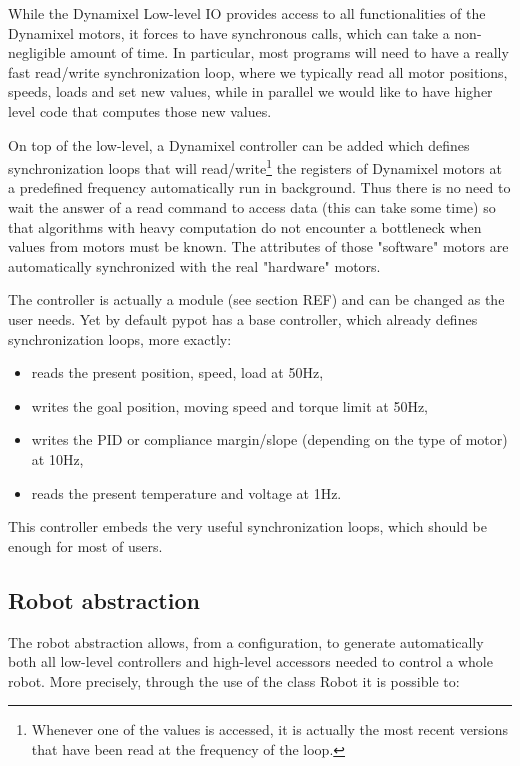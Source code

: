 While the Dynamixel Low-level IO provides access to all functionalities of the Dynamixel motors, it forces to have synchronous calls, which can take a non-negligible amount of time. In particular, most programs will need to have a really fast read/write synchronization loop, where we typically read all motor positions, speeds, loads and set new values, while in parallel we would like to have higher level code that computes those new values.

On top of the low-level, a Dynamixel controller can be added which defines synchronization loops that will read/write\footnote{Whenever one of the values is accessed, it is actually the most recent versions that have been read at the frequency of the loop.} the registers of Dynamixel motors at a predefined frequency automatically run in background. Thus there is no need to wait the answer of a read command to access data (this can take some time) so that algorithms with heavy computation do not encounter a bottleneck when values from motors must be known. The attributes of those "software" motors are automatically synchronized with the real "hardware" motors.

The controller is actually a module (see section REF) and can be changed as the user needs. Yet by default pypot has a base controller, which already defines synchronization loops, more exactly:

\begin{itemize}
    \item reads the present position, speed, load at 50Hz,
    \item writes the goal position, moving speed and torque limit at 50Hz,
    \item writes the PID or compliance margin/slope (depending on the type of motor) at 10Hz,
    \item reads the present temperature and voltage at 1Hz.
\end{itemize}

This controller embeds the very useful synchronization loops, which should be enough for most of users.



\subsection{Robot abstraction} %

The robot abstraction allows, from a configuration, to generate automatically both all low-level controllers and high-level accessors needed to control a whole robot. More precisely, through the use of the class Robot it is possible to:

